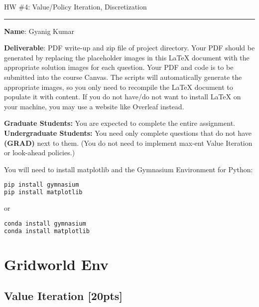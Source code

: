 \documentclass{article}
\newcommand{\ruleskip}{\bigskip\hrule\bigskip}
\begin{document}
\pagestyle{myheadings} 

{\huge
\noindent HW \#4: Value/Policy Iteration, Discretization}\\
\ruleskip
{\bf Name}: Gyanig Kumar

{\bf Deliverable}:  PDF write-up and zip file of project directory.  Your PDF should be generated by replacing the placeholder images in this LaTeX document with the appropriate solution images for each question.  Your PDF and code is to be submitted into the course Canvas. The scripts will automatically generate the appropriate images, so you only need to recompile the LaTeX document to populate it with content. If you do not have/do not want to install LaTeX on your machine, you may use a website like Overleaf instead.

\textbf{Graduate Students:} You are expected to complete the entire assignment.\\
\textbf{Undergraduate Students:} You need only complete questions that do not have \textbf{(GRAD)} next to them. (You do not need to implement max-ent Value Iteration or look-ahead policies.)\\

\vspace{.1in}

You will need to install matplotlib and the Gymnasium Environment for Python:\\
\begin{lstlisting}[language=bash]
pip install gymnasium
pip install matplotlib
\end{lstlisting}
or 
\begin{lstlisting}[language=bash]
conda install gymnasium
conda install matplotlib
\end{lstlisting}

\vspace{.2in}

\section{Gridworld Env}
\subsection{Value Iteration [20pts]}
\end{document}
